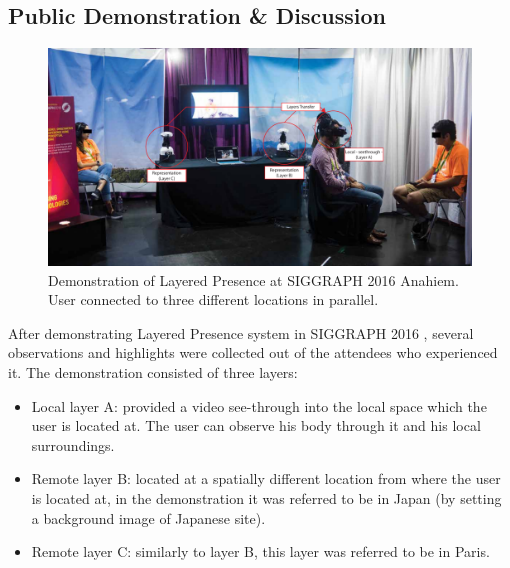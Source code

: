 \subsection{Public Demonstration \& Discussion}

\begin{figure}[b!]
  \centering
  \captionsetup{justification=centering}
  \includegraphics[width=1\linewidth]{figures/eval/SIGGRAPH/LP_SIGGRAPH.pdf}
  \par
  \caption{Demonstration of Layered Presence at SIGGRAPH 2016 Anahiem. User connected to three different locations in parallel.}
  \vspace*{\floatsep}
  \label{fig:LP-siggraph}
\end{figure}

After demonstrating Layered Presence system in SIGGRAPH 2016 \cite{saraiji2016layered}, several observations and highlights were collected out of the attendees who experienced it. The demonstration consisted of three layers: 
\begin{itemize}
\item Local layer A: provided a video see-through into the local space which the user is located at. The user can observe his body through it and his local surroundings.
\item Remote layer B: located at a spatially different location from where the user is located at, in the demonstration it was referred to be in Japan (by setting a background image of Japanese site).
\item Remote layer C: similarly to layer B, this layer was referred to be in Paris. 
\end{itemize}


